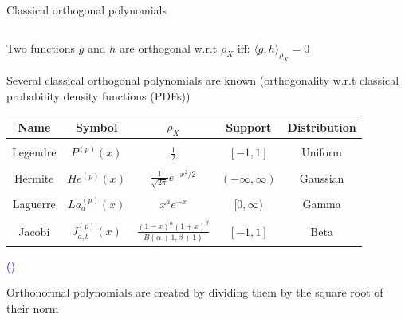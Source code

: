 \documentclass[english,aspectratio=169]{beamer}
\let\tempone\itemize
\let\temptwo\enditemize
\renewenvironment{itemize}{\tempone\addtolength{\itemsep}{0.35\baselineskip}}{\temptwo}
\begin{document}
\begin{frame}[fragile]{Classical orthogonal polynomials}
  \footnotesize
  
  \begin{columns}[T,onlytextwidth]
    \begin{column}{0.70\textwidth}
      \begin{itemize}
        \item Two functions $g$ and $h$ are orthogonal w.r.t $\rho_X$ iff: $\langle g,h \rangle_{\rho_X} = 0$
        \item Several classical orthogonal polynomials are known
              (orthogonality w.r.t classical probability density functions (PDFs))
      \end{itemize}
      \begin{table}
        \centering
      \begin{tabular}{c c c c c} \hline
        Name & Symbol & $\rho_X$ & Support & Distribution  \\ \hline
        & & & & \\
        Legendre & $P^{(p)}(x)$& $\frac{1}{2}$ & $[-1,1]$            & Uniform \\
        & & & & \\
        Hermite  & $He^{(p)}(x)$ & $\frac{1}{\sqrt{2\pi}}e^{-x^2/2}$ & $(-\infty,\infty)$  & Gaussian \\
        & & & & \\
        Laguerre & $La^{(p)}_a(x)$ & $x^a e^{-x}$ & $[0,\infty)$        & Gamma \\
        & & & & \\
        Jacobi   & $J^{(p)}_{a,b}(x)$ & $\frac{(1-x)^\alpha(1+x)^\beta}{B(\alpha+1,\beta+1)}$ & $[-1,1]$             & Beta \\
        \hline
      \end{tabular}
  
      {\hfill \raggedright \tiny \textcolor{blue}{(\cite{Xiu2002})}}
  
      {\hfill \raggedright \tiny Orthonormal polynomials are created by dividing them by the square root of their norm}
  
    \end{table}
  

\end{column}
\end{columns}
\end{frame}
\end{document}
